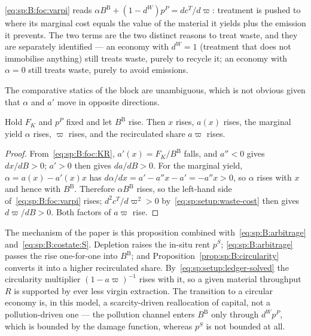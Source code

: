  \eqref{eq:sp:B:foc:varpi} reads
$\alpha B^{\mathrm B}+\left(1-d^W\right)p^P=dc^T/d\varpi$: treatment is pushed to where its marginal cost equals the
value of the material it yields plus the emission it prevents. The two terms are the two distinct
reasons to treat waste, and they are separately identified --- an economy with $d^W=1$ (treatment that
does not immobilise anything) still treats waste, purely to recycle it; an economy with $\alpha=0$ still
treats waste, purely to avoid emissions.

 The comparative statics of the block are unambiguous,
which is not obvious given that $\alpha$ and $a'$ move in opposite directions.

\begin{proposition}\label{prop:sp:B:circularity}
Hold $F_K$ and $p^P$ fixed and let $B^{\mathrm B}$ rise. Then $x$ rises, $a(x)$ rises, the marginal yield $\alpha$
rises, $\varpi$ rises, and the recirculated share $a\varpi$ rises.
\end{proposition}

\begin{proof}
From~\eqref{eq:sp:B:foc:KR}, $a'(x)=F_K/B^{\mathrm B}$ falls, and $a''<0$ gives $dx/dB>0$; $a'>0$ then gives
$da/dB>0$. For the marginal yield, $\alpha=a(x)-a'(x)x$ has $d\alpha/dx=a'-a''x-a'=-a''x>0$, so $\alpha$
rises with $x$ and hence with $B^{\mathrm B}$. Therefore $\alpha B^{\mathrm B}$ rises, so the left-hand side
of~\eqref{eq:sp:B:foc:varpi} rises; $d^2c^T/d\varpi^2>0$ by~\eqref{eq:sp:setup:waste-cost} then gives
$d\varpi/dB>0$. Both factors of $a\varpi$ rise.
\end{proof}

The mechanism of the paper is this proposition combined with~\eqref{eq:sp:B:arbitrage}
and~\eqref{eq:sp:B:costate:S}. Depletion raises the in-situ rent $p^S$; \eqref{eq:sp:B:arbitrage} passes
the rise one-for-one into $B^{\mathrm B}$; and Proposition~\ref{prop:sp:B:circularity} converts it into a higher
recirculated share. By~\eqref{eq:sp:setup:ledger-solved} the circularity multiplier
$\left(1-a\varpi\right)^{-1}$ rises with it, so a given material throughput $R$ is supported by ever less
virgin extraction. The transition to a circular economy is, in this model, a scarcity-driven
reallocation of capital, not a pollution-driven one --- the pollution channel enters $B^{\mathrm B}$ only through
$d^Wp^P$, which is bounded by the damage function, whereas $p^S$ is not bounded at all.


